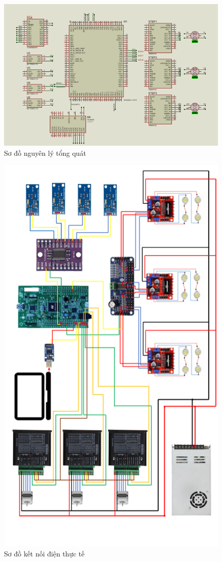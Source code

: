\begin{figure}[htp]
	\centering
	\includegraphics[scale=1]{Chapters/Chapter4/Images/Sodonguyenlytongquat.png}
	\caption{Sơ đồ nguyên lý tổng quát}
	\label{fig:C4Sodotongquat}
\end{figure}
\begin{figure}[htp]
	\centering
	\includegraphics[scale=1]{Chapters/Chapter4/Images/Sodoketnoithucte.png}
	\caption{Sơ đồ kết nối điện thực tế}
	\label{fig:C4Sodothucte}
\end{figure}

